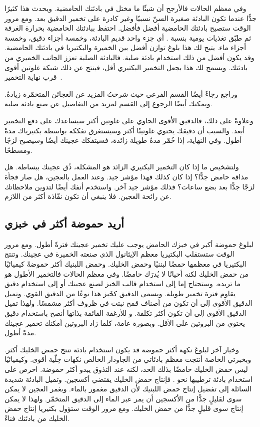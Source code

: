 وفي معظم الحالات فالأرجح أن شيئًا ما مختل في بادئتك الحامضية. ويحدث هذا كثيرًا جدًّا عندما تكون البادئة صغيرة السنّ نسبيًا وغير كادرة على تخمير الدقيق بعد. ومع مرور الوقت ستصبح بادئتك الحامضية أفضل فأفضل. احتفظ ببادئتك الحامضية بحرارة الغرفة ثم طبّق تغذيات يومية بنسبة . أي جزء واحد قديم البادئة، وخمسة أجزاء دقيق، وخمسة أجزاء ماء. يتيح لك هذا بلوغ توازن أفضل بين الخميرة والبكتيريا في بادئتك الحامضية. وقد يكون أفضل من ذلك استخدام بادئة صلبة. فالبادئة الصلبة تعزز الجانب الخميري من بادئتك. ويسمح لك هذا بجعل التخمير البكتيري أقل، فينتج عن ذلك شبكة غلوتين أقوى قرب نهاية التخمير~\cite{stiff+starter}.

وراجع رجاءً أيضًا القسم الفرعي  حيث شرحتُ المزيد عن العجائن المتخمّرة زيادةً. ويمكنك أيضًا الرجوع إلى القسم  لمزيد من التفاصيل عن صنع بادئة صلبة.

وعلاوةً على ذلك، فالدقيق الأقوى الحاوي على غلوتين أكثر سيساعدك على دفع التخمير أبعد. والسبب أن دقيقك يحتوي غلوتينًا أكثر وسيستغرق تفككه بواسطة بكتيرياك مدةً أطول. وفي النهاية، إذا خُمّر مدةً طويلة زائدة، فسيتفكك عجينك أيضًا وسيصبح لزجًا ومسطحًا.

ولتشخيص ما إذا كان التخمير البكتيري الزائد هو المشكلة، ذُق عجينك ببساطة. هل مذاقه حامض جدًّا؟ إذا كان كذلك فهذا مؤشر جيد. وعند العمل بالعجين، هل صار فجأة لزجًا جدًّا بعد بضع ساعات؟ فذلك مؤشر جيد آخر. واستخدم أنفك أيضًا لتدوين ملاحظاتك عن رائحة العجين. فلا ينبغي أن تكون نفّاذة أكثر من اللازم.

\subsection{أريد حموضة أكثر في خبزي}

لبلوغ حموضة أكبر في خبزك الحامض يوجب عليك تخمير عجينك فترةً أطول. ومع مرور الوقت ستستقلب البكتيريا معظم الإيثانول الذي صنعته الخميرة في عجينك. وتنتج البكتيريا في معظمها حمضًا لبننيًا وحمض الخليك. وحمض اللبنيك أكثر حموضةً كيميائيًا من حمض الخليك لكنه أحيانًا لا يُدرَك حامضًا. وفي معظم الحالات فالتخمير الأطول هو ما تريده. وستحتاج إما إلى استخدام قالب الخبز لصنع عجينك أو إلى استخدام دقيق يقاوم فترة تخمير طويلة. ويسمى الدقيق كخَبز هذا نوعًا من الدقيق القوي. وتميل الدقيق الأقوى إلى أن تكون من أصناف قمح نبتت في ظروف أكثر مشمسًا. ولهذا تميل الدقيق الأقوى إلى أن تكون أكثر تكلفة. و للأرغفة القائمة بذاتها أنصح باستخدام دقيق يحتوي  من البروتين على الأقل. وبصورة عامة، كلما زاد البروتين أمكنك تخمير عجينك مدةً أطول.

وخيار آخر لبلوغ نكهة أكثر حموضة قد يكون استخدام بادئة تنتج حمض الخليك أكثر. وبخبرتي الخاصة أنتجت معظم بادئاتي من الجاودار الخالص نكهات خِلّية أقوى. وكيميائيًا ليس حمض الخليك حامضًا بذلك الحد، لكنه عند التذوق يبدو أكثر حموضة. احرص على استخدام بادئة ترطيبها نحو . فإنتاج حمض الخليك يقتضي أكسجين. وتميل البادئة شديدة السائلة إلى تفضيل إنتاج حمض اللبنيك لأن الدقيق مغمور بالماء. وبغمر العجين لا يمكن سوى لقليلٍ جدًّا من الأكسجين أن يمر عبر الماء إلى الدقيق المتخمّر. ولهذا لا يمكن إنتاج سوى قليلٍ جدًّا من حمض الخليك. ومع مرور الوقت ستؤول بكتيريا إنتاج حمض الخليك من بادئتك فناءً.

